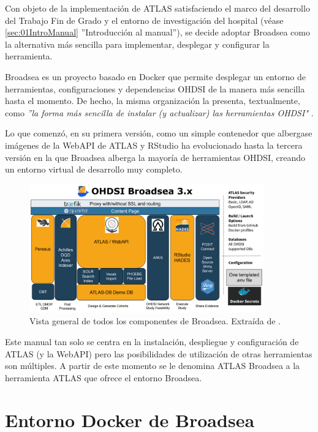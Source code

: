Con objeto de la implementación de ATLAS satisfaciendo el marco del desarrollo del Trabajo Fin de Grado y el entorno de investigación del hospital (véase \ref{sec:01IntroManual} ''Introducción al manual''), se decide adoptar Broadsea como la alternativa más sencilla para implementar, desplegar y configurar la herramienta.

Broadsea es un proyecto basado en Docker que permite desplegar un entorno de herramientas, configuraciones y dependencias OHDSI de la manera más sencilla hasta el momento. De hecho, la misma organización la presenta, textualmente, como \textit{''la forma más sencilla de instalar (y actualizar) las herramientas OHDSI"} \cite{Broadsea3PDF}. 

Lo que comenzó, en su primera versión, como un simple contenedor que albergase imágenes de la WebAPI de ATLAS y RStudio \cite{Broadsea3PPTX} ha evolucionado hasta la tercera versión en la que Broadsea alberga la mayoría de herramientas OHDSI, creando un entorno virtual de desarrollo muy completo.

\begin{figure}[H]
    \centering
    \includegraphics[width=0.90\textwidth]{figures/OHDSIBroadsea3.0.png}
    \caption{Vista general de todos los componentes de Broadsea. Extraída de \cite{Broadsea3PPTX}.}
    \label{fig:OHDSIBroadsea3.0}
\end{figure}

Este manual tan solo se centra en la instalación, despliegue y configuración de ATLAS (y la WebAPI) pero las posibilidades de utilización de otras herramientas son múltiples. A partir de este momento se le denomina ATLAS Broadsea a la herramienta ATLAS que ofrece el entorno Broadsea.


\section{Entorno Docker de Broadsea} \label{sec:01Docker}

